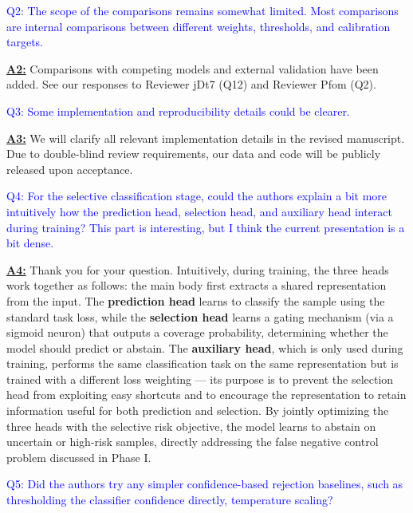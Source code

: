 \documentclass[UTF8,12pt]{article}
\begin{document}
\textcolor{blue}{Q2: The scope of the comparisons remains somewhat limited. Most comparisons are internal comparisons between different weights, thresholds, and calibration targets.}

\underline{{\bf A2:}} Comparisons with competing models and external validation have been added. See our responses to Reviewer jDt7 (Q12) and Reviewer Pfom (Q2).

\textcolor{blue}{Q3: Some implementation and reproducibility details could be clearer.}

\underline{{\bf A3:}} We will clarify all relevant implementation details in the revised manuscript. Due to double-blind review requirements, our data and code will be publicly released upon acceptance.

\textcolor{blue}{Q4: For the selective classification stage, could the authors explain a bit more intuitively how the prediction head, selection head, and auxiliary head interact during training? This part is interesting, but I think the current presentation is a bit dense.}

\underline{{\bf A4:}} Thank you for your question. Intuitively, during training, the three heads work together as follows: the main body first extracts a shared representation from the input. The \textbf{prediction head} learns to classify the sample using the standard task loss, while the \textbf{selection head} learns a gating mechanism (via a sigmoid neuron) that outputs a coverage probability, determining whether the model should predict or abstain. The \textbf{auxiliary head}, which is only used during training, performs the same classification task on the same representation but is trained with a different loss weighting — its purpose is to prevent the selection head from exploiting easy shortcuts and to encourage the representation to retain information useful for both prediction and selection. By jointly optimizing the three heads with the selective risk objective, the model learns to abstain on uncertain or high-risk samples, directly addressing the false negative control problem discussed in Phase I.

\textcolor{blue}{Q5: Did the authors try any simpler confidence-based rejection baselines, such as thresholding the classifier confidence directly, temperature scaling?}
\end{document}
